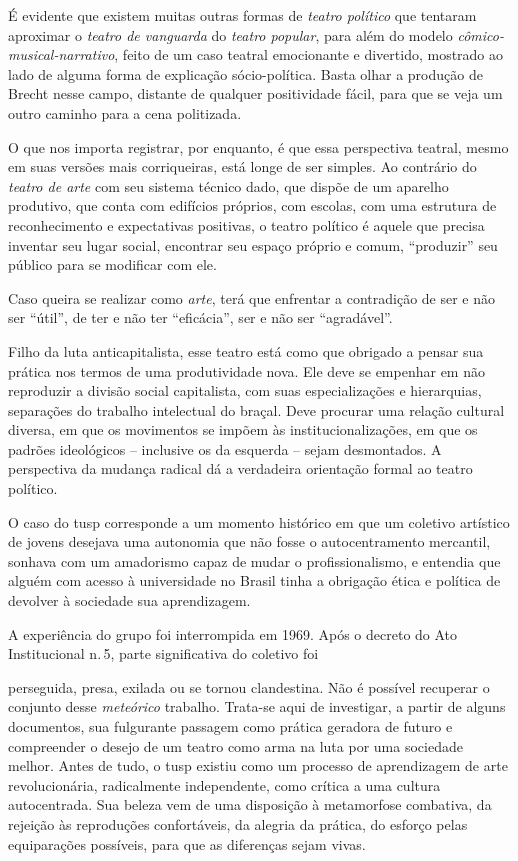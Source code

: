 É evidente que existem muitas outras formas de {\it teatro político} que
tentaram aproximar o {\it teatro de vanguarda} do {\it teatro popular},
para além do modelo {\it cômico-musical-narrativo}, feito de um caso
teatral emocionante e divertido, mostrado ao lado de alguma forma de
explicação sócio-política. Basta olhar a produção de Brecht nesse campo,
distante de qualquer positividade fácil, para que se veja um outro
caminho para a cena politizada.

O que nos importa registrar, por enquanto, é que essa perspectiva
teatral, mesmo em suas versões mais corriqueiras, está longe de ser
simples. Ao contrário do {\it teatro de arte} com seu sistema técnico
dado, que dispõe de um aparelho produtivo, que conta com edifícios
próprios, com escolas, com uma estrutura de reconhecimento e
expectativas positivas, o teatro político é aquele que precisa inventar
seu lugar social, encontrar seu espaço próprio e comum, “produzir” seu
público para se modificar com ele.

Caso queira se realizar como {\it arte}, terá que enfrentar a contradição
de ser e não ser “útil”, de ter e não ter “eficácia”, ser e não ser
“agradável”.

Filho da luta anticapitalista, esse teatro está como que obrigado
a pensar sua prática nos termos de uma produtividade nova. Ele deve se
empenhar em não reproduzir a divisão social capitalista, com suas
especializações e hierarquias, separações do trabalho intelectual do
braçal. Deve procurar uma relação cultural diversa, em que os movimentos
se impõem às institucionalizações, em que os padrões ideológicos --
inclusive os da esquerda -- sejam desmontados. A perspectiva da mudança
radical dá a verdadeira orientação formal ao teatro político.

O caso do {\sc tusp} corresponde a um
momento histórico em que um coletivo artístico de jovens desejava uma
autonomia que não fosse o autocentramento mercantil, sonhava com um
amadorismo capaz de mudar o profissionalismo, e entendia que alguém com
acesso à universidade no Brasil tinha a obrigação ética e política de
devolver à sociedade sua aprendizagem.

A experiência do grupo foi interrompida em 1969. Após o decreto do
Ato Institucional n.\,5, parte significativa do coletivo foi

\column 

\noindent{}perseguida, presa, exilada ou se tornou clandestina. Não é possível
recuperar o conjunto desse {\it meteórico} trabalho. Trata-se aqui de
investigar, a partir de alguns documentos, sua fulgurante passagem como
prática geradora de futuro e compreender o desejo de um teatro como arma na luta por uma sociedade melhor. 
Antes de tudo, o {\sc tusp} existiu
como um processo de aprendizagem de arte revolucionária, radicalmente
independente, como crítica a uma cultura autocentrada. Sua beleza vem de
uma disposição à metamorfose combativa, da rejeição às reproduções
confortáveis, da alegria da prática, do esforço pelas equiparações
possíveis, para que as diferenças sejam vivas.

